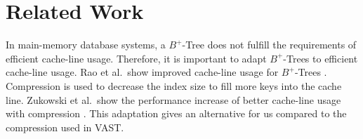 \documentclass[runningheads,a4paper]{llncs}
\begin{document}




\section{Related Work}
In main-memory database systems, a $B^+$-Tree does not fulfill the requirements of efficient cache-line usage. Therefore, it is important to adapt $B^+$-Trees to efficient cache-line usage. Rao et al.\ show improved cache-line usage for $B^+$-Trees \cite{rao1999cache}. Compression is used to decrease the index size to fill more keys into the cache line. Zukowski et al.\ show the performance increase of better cache-line usage with compression \cite{zukowski2006super}. This adaptation gives an alternative for us compared to the compression used in VAST. 
\end{document}
